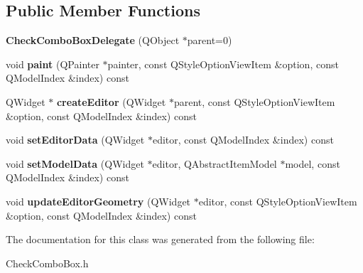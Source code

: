\subsection*{Public Member Functions}
\begin{DoxyCompactItemize}
\item 
\hypertarget{class_check_combo_box_delegate_a7700b22d9ff9e0a5e4553f7921ec678c}{{\bfseries Check\-Combo\-Box\-Delegate} (Q\-Object $\ast$parent=0)}\label{class_check_combo_box_delegate_a7700b22d9ff9e0a5e4553f7921ec678c}

\item 
\hypertarget{class_check_combo_box_delegate_a6f26d10b5f13106f2ed72abf1a4b1fb9}{void {\bfseries paint} (Q\-Painter $\ast$painter, const Q\-Style\-Option\-View\-Item \&option, const Q\-Model\-Index \&index) const }\label{class_check_combo_box_delegate_a6f26d10b5f13106f2ed72abf1a4b1fb9}

\item 
\hypertarget{class_check_combo_box_delegate_a257c6e76c666d338eaddb6349602ac80}{Q\-Widget $\ast$ {\bfseries create\-Editor} (Q\-Widget $\ast$parent, const Q\-Style\-Option\-View\-Item \&option, const Q\-Model\-Index \&index) const }\label{class_check_combo_box_delegate_a257c6e76c666d338eaddb6349602ac80}

\item 
\hypertarget{class_check_combo_box_delegate_a5f64d65ff6e648b806cf741826049b65}{void {\bfseries set\-Editor\-Data} (Q\-Widget $\ast$editor, const Q\-Model\-Index \&index) const }\label{class_check_combo_box_delegate_a5f64d65ff6e648b806cf741826049b65}

\item 
\hypertarget{class_check_combo_box_delegate_ad8addfe5b98f5c38e4cef3dfe2bd9bb0}{void {\bfseries set\-Model\-Data} (Q\-Widget $\ast$editor, Q\-Abstract\-Item\-Model $\ast$model, const Q\-Model\-Index \&index) const }\label{class_check_combo_box_delegate_ad8addfe5b98f5c38e4cef3dfe2bd9bb0}

\item 
\hypertarget{class_check_combo_box_delegate_ad065966f763ab29b30e345680023e485}{void {\bfseries update\-Editor\-Geometry} (Q\-Widget $\ast$editor, const Q\-Style\-Option\-View\-Item \&option, const Q\-Model\-Index \&index) const }\label{class_check_combo_box_delegate_ad065966f763ab29b30e345680023e485}

\end{DoxyCompactItemize}


The documentation for this class was generated from the following file\-:\begin{DoxyCompactItemize}
\item 
Check\-Combo\-Box.\-h\end{DoxyCompactItemize}
